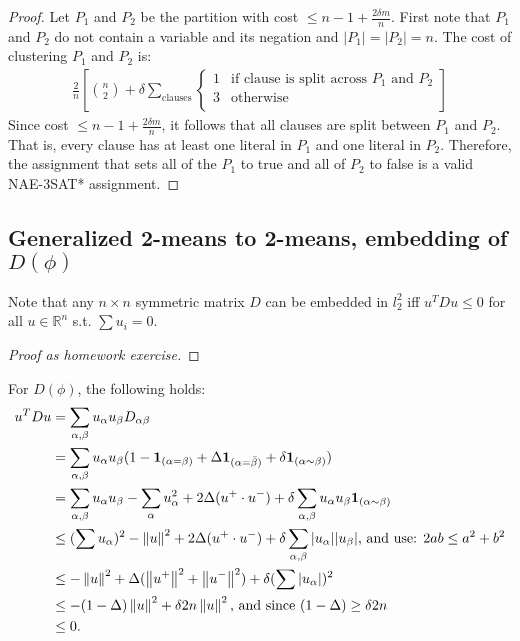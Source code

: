 \begin{proof}
Let $P_1$ and $P_2$ be the partition with cost $\le n - 1 +
\frac{2\delta m}{n}$.  First note that $P_1$ and $P_2$ do not contain
a variable and its negation and $|P_1| = |P_2| = n$.  The cost of
clustering $P_1$ and $P_2$ is:
\begin{align*}
  \frac{2}{n} \left[ {n \choose 2} + \delta \sum_{\textrm{clauses}} 
  \begin{cases}
    1 & \textrm{if clause is split across $P_1$ and $P_2$}\\  
    3 & \textrm{otherwise} \\ 
  \end{cases}\right]
\end{align*}
Since cost $\le n - 1 + \frac{2\delta m}{n}$, it follows that all
clauses are split between $P_1$ and $P_2$.  That is, every clause has
at least one literal in $P_1$ and one literal in $P_2$.  Therefore,
the assignment that sets all of the $P_1$ to true and all of $P_2$ to
false is a valid NAE-3SAT* assignment. 
\end{proof}



\subsection{Generalized 2-means to 2-means, embedding of $D(\phi)$}

\begin{fact}
Note that any $n \times n$ symmetric matrix $D$ can be embedded in
$l_2^2$ iff $u^TDu  \le 0$ for all $u \in \mathbb{R}^n$ s.t. $\sum u_i
= 0$. 
\end{fact}
\begin{proof}[Proof as homework exercise]
\end{proof}

\begin{fact} \label{d-phi-fact}
For $D(\phi)$, the following holds:
\begin{align*}
u^TDu &= \sum_{\alpha, \beta} u_\alpha u_\beta D_{\alpha \beta}\\ 
&=\sum_{\alpha, \beta} u_\alpha u_\beta (1 - \mathbf{1}_{(\alpha =
  \beta)} + \Delta\mathbf{1}_{(\alpha = \bar{\beta})} + \delta
\mathbf{1}_{(\alpha \sim \beta)})\\ 
&=\sum_{\alpha, \beta} u_\alpha u_\beta - \sum_{\alpha} u_\alpha^2
+2\Delta (u^+ \cdot u^-) + \delta \sum_{\alpha, \beta} u_\alpha
u_\beta \mathbf{1}_{(\alpha \sim \beta)}\\ 
& \le (\sum u_\alpha)^2  - \left\lVert u\right\rVert^2 + 2\Delta (u^+ \cdot u^-) +
\delta \sum_{\alpha, \beta} |u_\alpha| |u_\beta| \text{,  and use:
  $2ab \le a^2 + b^2$}\\  
& \le - \left\lVert u\right\rVert^2 + \Delta (\left\lVert u^+\right\rVert^2  + \left\lVert u^-\right\rVert^2) + \delta
(\sum |u_\alpha|)^2 \\ 
& \le -(1- \Delta) \left\lVert u\right\rVert^2  + \delta 2n \left\lVert u\right\rVert^2  \text{,  and
  since $(1- \Delta) \ge \delta 2n$} \\ 
& \le 0.
\end{align*}
\end{fact}


